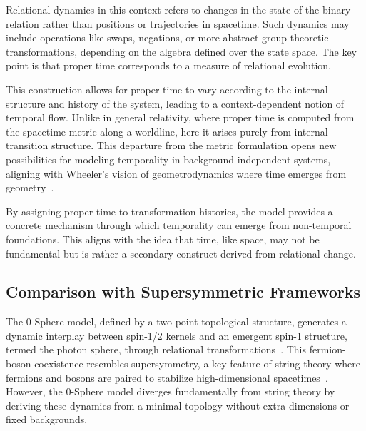 \documentclass[%
 reprint,
 amsmath,amssymb,
 aps,
]{revtex4-1}
\numberwithin{equation}{section}%
\begin{document}
Relational dynamics in this context refers to changes in the state of the binary relation rather than positions or trajectories in spacetime. Such dynamics may include operations like swaps, negations, or more abstract group-theoretic transformations, depending on the algebra defined over the state space. The key point is that proper time corresponds to a measure of relational evolution.

This construction allows for proper time to vary according to the internal structure and history of the system, leading to a context-dependent notion of temporal flow. Unlike in general relativity, where proper time is computed from the spacetime metric along a worldline, here it arises purely from internal transition structure. This departure from the metric formulation opens new possibilities for modeling temporality in background-independent systems, aligning with Wheeler's vision of geometrodynamics where time emerges from geometry~\cite{wheeler1962}.

By assigning proper time to transformation histories, the model provides a concrete mechanism through which temporality can emerge from non-temporal foundations. This aligns with the idea that time, like space, may not be fundamental but is rather a secondary construct derived from relational change.

\subsection{Comparison with Supersymmetric Frameworks}
\label{subsec:supersymmetry}

The 0-Sphere model, defined by a two-point topological structure, generates a dynamic interplay between spin-1/2 kernels and an emergent spin-1 structure, termed the photon sphere, through relational transformations~\cite{hanamura2309.0047, hanamura2506.0072}. This fermion-boson coexistence resembles supersymmetry, a key feature of string theory where fermions and bosons are paired to stabilize high-dimensional spacetimes~\cite{polchinski1998}. However, the 0-Sphere model diverges fundamentally from string theory by deriving these dynamics from a minimal topology without extra dimensions or fixed backgrounds.
\end{document}
